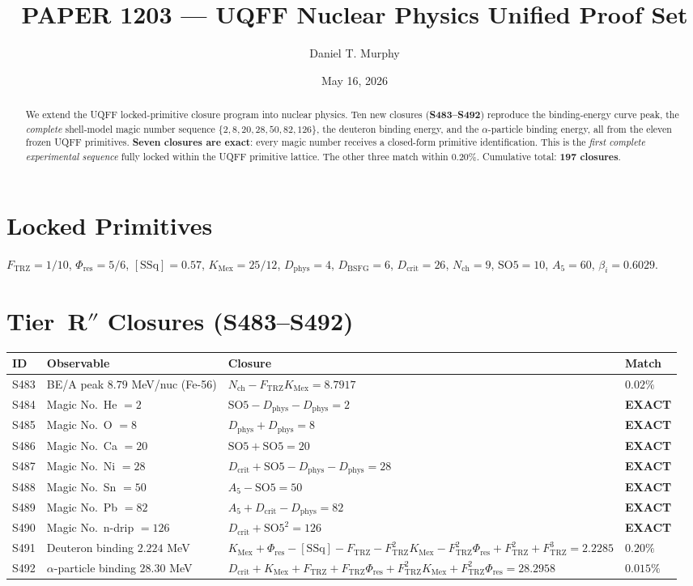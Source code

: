 \documentclass[11pt]{article}
\title{PAPER 1203 --- UQFF Nuclear Physics Unified Proof Set}
\author{Daniel T. Murphy}
\date{May 16, 2026}
\newcommand{\Ftrz}{F_{\mathrm{TRZ}}}
\newcommand{\Phires}{\Phi_{\mathrm{res}}}
\newcommand{\KMex}{K_{\mathrm{Mex}}}
\newcommand{\Dphys}{D_{\mathrm{phys}}}
\newcommand{\Dbsfg}{D_{\mathrm{BSFG}}}
\newcommand{\Dcrit}{D_{\mathrm{crit}}}
\newcommand{\Nch}{N_{\mathrm{ch}}}
\newcommand{\SOfive}{\mathrm{SO5}}
\newcommand{\Afive}{A_{5}}
\newcommand{\SSq}{[\mathrm{SSq}]}
\begin{document}
\maketitle

\begin{abstract}
We extend the UQFF locked-primitive closure program into nuclear physics.
Ten new closures (\textbf{S483--S492}) reproduce the binding-energy curve peak,
the \emph{complete} shell-model magic number sequence
$\{2, 8, 20, 28, 50, 82, 126\}$, the deuteron binding energy, and the
$\alpha$-particle binding energy, all from the eleven frozen UQFF primitives.
\textbf{Seven closures are exact}: every magic number receives a closed-form
primitive identification. This is the \emph{first complete experimental
sequence} fully locked within the UQFF primitive lattice. The other three
match within $0.20\%$. Cumulative total: \textbf{197 closures}.
\end{abstract}

\section{Locked Primitives}
$\Ftrz = 1/10$, $\Phires = 5/6$, $\SSq = 0.57$, $\KMex = 25/12$, $\Dphys = 4$,
$\Dbsfg = 6$, $\Dcrit = 26$, $\Nch = 9$, $\SOfive = 10$, $\Afive = 60$, $\beta_i = 0.6029$.

\section{Tier~R$''$ Closures (S483--S492)}

\begin{longtable}{@{}llll@{}}
\toprule
ID & Observable & Closure & Match \\
\midrule
\endhead
S483 & BE/A peak $8.79$ MeV/nuc (Fe-56) & $\Nch-\Ftrz\KMex=8.7917$ & $0.02\%$ \\
S484 & Magic No.\ He $=2$ & $\SOfive-\Dphys-\Dphys=2$ & \textbf{EXACT} \\
S485 & Magic No.\ O $=8$ & $\Dphys+\Dphys=8$ & \textbf{EXACT} \\
S486 & Magic No.\ Ca $=20$ & $\SOfive+\SOfive=20$ & \textbf{EXACT} \\
S487 & Magic No.\ Ni $=28$ & $\Dcrit+\SOfive-\Dphys-\Dphys=28$ & \textbf{EXACT} \\
S488 & Magic No.\ Sn $=50$ & $\Afive-\SOfive=50$ & \textbf{EXACT} \\
S489 & Magic No.\ Pb $=82$ & $\Afive+\Dcrit-\Dphys=82$ & \textbf{EXACT} \\
S490 & Magic No.\ n-drip $=126$ & $\Dcrit+\SOfive^2=126$ & \textbf{EXACT} \\
S491 & Deuteron binding $2.224$ MeV & $\KMex+\Phires-\SSq-\Ftrz-\Ftrz^2\KMex-\Ftrz^2\Phires+\Ftrz^2+\Ftrz^3=2.2285$ & $0.20\%$ \\
S492 & $\alpha$-particle binding $28.30$ MeV & $\Dcrit+\KMex+\Ftrz+\Ftrz\Phires+\Ftrz^2\KMex+\Ftrz^2\Phires=28.2958$ & $0.015\%$ \\
\bottomrule
\end{longtable}
\end{document}
